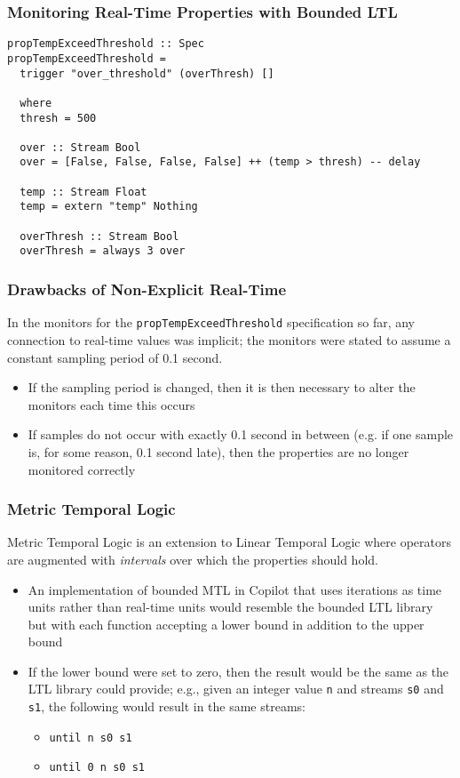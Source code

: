 \documentclass{beamer}
\begin{document}
\begin{frame}[fragile]
\frametitle{Monitoring Real-Time Properties with Bounded LTL}
\begin{lstlisting}
propTempExceedThreshold :: Spec
propTempExceedThreshold =
  trigger "over_threshold" (overThresh) []

  where
  thresh = 500

  over :: Stream Bool
  over = [False, False, False, False] ++ (temp > thresh) -- delay

  temp :: Stream Float
  temp = extern "temp" Nothing

  overThresh :: Stream Bool
  overThresh = always 3 over
\end{lstlisting}
\end{frame}

\begin{frame}
\frametitle{Drawbacks of Non-Explicit Real-Time}
In the monitors for the \texttt{propTempExceedThreshold} specification so far,
any connection to real-time values  was implicit;
the monitors were stated to assume a constant sampling period of 0.1 second.
\begin{itemize}
\item If the sampling period is changed, then it is then necessary to alter the
monitors each time this occurs
\item If samples do not occur with exactly 0.1 second in between (e.g. if one sample
is, for some reason, 0.1 second late), then the properties are no longer monitored
correctly
\end{itemize}
\end{frame}

\begin{frame}[fragile]
\frametitle{Metric Temporal Logic}
Metric Temporal Logic is an extension to Linear Temporal Logic where operators
are augmented with \emph{intervals} over which the properties should hold.
\begin{itemize}
\item An implementation of bounded MTL in Copilot that uses iterations
as time units rather than real-time units would resemble the bounded
LTL library but with each function accepting a lower bound in addition
to the upper bound
\item If the lower bound were set to zero, then the result would be the same as the LTL
library could provide; e.g., given an integer value \texttt{n} and streams \texttt{s0}
and \texttt{s1}, the following would result in the same streams:
 \begin{itemize}
 \item \verb,until n s0 s1,
 \item \verb,until 0 n s0 s1,
 \end{itemize}
\end{itemize}
\end{frame}
\end{document}
